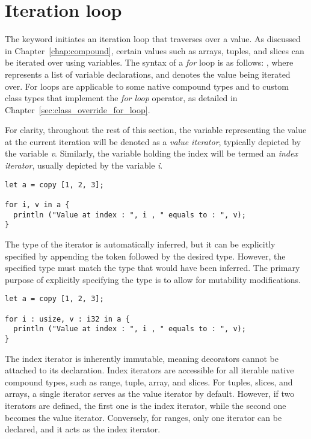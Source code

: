 \section{Iteration loop}%
\label{sec:for_loop}

The keyword  initiates an iteration loop that traverses over a value.
As discussed in Chapter~\ref{chap:compound}, certain values such as arrays,
tuples, and slices can be iterated over using variables. The syntax of a
\textit{for} loop is as follows: , where  represents a list of variable declarations, and  denotes the
value being iterated over. For loops are applicable to some native compound
types and to custom class types that implement the \textit{for loop} operator,
as detailed in Chapter~\ref{sec:class_override_for_loop}.

For clarity, throughout the rest of this section, the variable representing the
value at the current iteration will be denoted as a \textit{value iterator},
typically depicted by the variable \textit{v}. Similarly, the variable holding
the index will be termed an \textit{index iterator}, usually depicted by the
variable \textit{i}.

\begin{lstlisting}[style=coloredverbatim, escapechar=@]
let a = copy [1, 2, 3];

for i, v in a {
  println ("Value at index : ", i , " equals to : ", v);
}
\end{lstlisting}

The type of the iterator is automatically inferred, but it can be explicitly
specified by appending the token \token{:} followed by the desired type.
However, the specified type must match the type that would have been inferred.
The primary purpose of explicitly specifying the type is to allow for mutability
modifications.

\begin{lstlisting}[style=coloredverbatim, escapechar=@]
let a = copy [1, 2, 3];

for i : usize, v : i32 in a {
  println ("Value at index : ", i , " equals to : ", v);
}
\end{lstlisting}

The index iterator is inherently immutable, meaning decorators cannot be
attached to its declaration. Index iterators are accessible for all iterable
native compound types, such as range, tuple, array, and slices. For tuples,
slices, and arrays, a single iterator serves as the value iterator by default.
However, if two iterators are defined, the first one is the index iterator,
while the second one becomes the value iterator. Conversely, for ranges, only
one iterator can be declared, and it acts as the index iterator.

